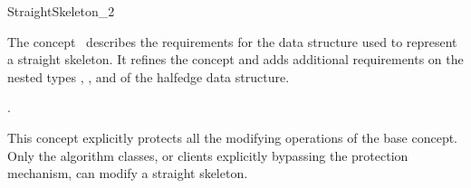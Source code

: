 
\begin{ccRefConcept}{StraightSkeleton_2}


\ccDefinition

The concept \ccRefName\ describes the requirements for the data structure
used to represent a straight skeleton. It refines the concept
 and adds additional requirements on the nested types
, , and  of the halfedge data structure.

\ccRefines
{}

\ccTypes
  \ccGlue
  \ccGlue

\ccHasModels

.

This concept explicitly protects all the modifying operations of the base  concept. Only the algorithm classes, or clients explicitly bypassing the protection mechanism, can modify a straight skeleton.
 
\end{ccRefConcept}

